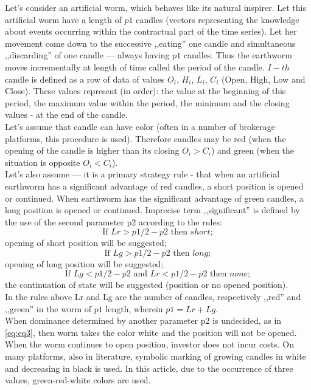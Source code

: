 \documentclass[runningheads,a4paper]{llncs}
\begin{document}
Let's consider an artificial worm, which behaves like its natural inspirer. Let this artificial worm have a length of $p1$ candles (vectors representing the knowledge about events occurring within the contractual part of the time series). Let her movement come down to the successive ,,eating'' one candle and simultaneous ,,discarding'' of one candle --- always having $p1$ candles. Thus the earthworm moves incrementally at length of time called the period of the candle. $I-th$ candle is  defined as a row of data of values  $O_i$, $H_i$, $L_i$, $C_i$ (Open, High, Low and Close). These values represent (in order): the value at the beginning of this period, the maximum value within the period, the minimum and the closing values - at the end of the candle.\\
Let's assume that candle can have color (often in a number of brokerage platforms, this procedure is used). Therefore candles may be red (when the opening of the candle is higher than its closing $O_i>C_i$) and green (when the situation is opposite $O_i<C_i$).\\
Let's also assume --- it is a primary strategy rule - that when an artificial earthworm has a significant advantage of red candles, a short position is opened or continued. When earthworm has the significant advantage of green candles, a long position is opened or continued. Imprecise term ,,significant'' is defined by the use of the second parameter p2 according to the rules:
\begin{equation}
\text{If }  Lr > p1/2 -p2 \text{ then } short;
\end{equation}
opening of short position will be suggested;
\begin{equation}
\text{If }  Lg > p1/2 -p2 \text{ then } long;
\end{equation}
opening of long position will be suggested;
\begin{equation}
\text{If }  Lg < p1/2 -p2 \text{ and } Lr< p1/2-p2 \text{ then } none;
\label{eq:eq3}
\end{equation}
the continuation of state will be suggested (position or no opened position).\\

In the rules above Lr and Lg are the number of candles, respectively ,,red'' and ,,green'' in the worm of $p1$ length, wherein $p1 = Lr + Lg$.\\
When dominance determined by another parameter p2 is undecided, as in \ref{eq:eq3}, then worm takes the color white and the position will not be opened. When the worm continues to open position, investor does not incur costs. On many platforms, also in literature, symbolic marking of growing candles in white and decreasing in black is used. In this article, due to the occurrence of three values, green-red-white colors are used.\\
\end{document}
